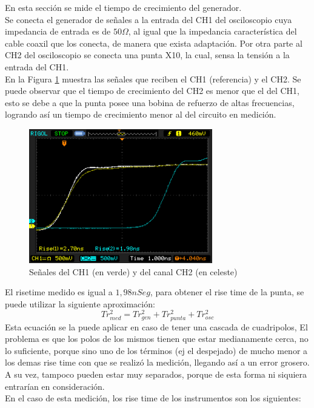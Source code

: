 \documentclass[a4paper,10pt]{article}
\begin{document}
		\indent En esta secci\'on se mide el tiempo de crecimiento del 
		generador. \\
 		\indent Se conecta el generador de se\~nales a la entrada del CH1 del
		osciloscopio cuya impedancia de entrada es de $50 \Omega$, al igual 
		que la impedancia caracter\'istica del cable coaxil que los conecta, 
		de manera que exista adaptaci\'on. Por otra parte al CH2 del 
		osciloscopio se conecta una punta X10, la cual, sensa la tensi\'on a 
		la entrada del CH1. \\
		\indent En la Figura \ref{img008} muestra las se\~nales que
		reciben el CH1 (referencia) y el CH2. Se puede observar que el tiempo
		de crecimiento del CH2 es menor que el del CH1, esto se debe a que la
		punta posee una bobina de refuerzo de altas frecuencias, logrando así
		un tiempo de crecimiento menor al del circuito en medición.
		
		\begin{figure}[!htb]
			\centering
			\includegraphics[width=8cm]
			{Imagenes/Mediciones instrumentos/NewFile10.png}
			\caption{Se\~nales del CH1 (en verde) y del canal CH2 (en celeste)
			} \label{img008}
		\end{figure}
		\indent El risetime medido es igual a $1,98 nSeg$, para obtener el 
		rise time de la punta, se puede utilizar la siguiente aproximación:
		$$Tr_{med}^2 = Tr_{gen}^2 + Tr_{punta}^2 + Tr_{osc}^2$$
		\indent Esta ecuación se la puede aplicar en caso de tener una cascada
		de cuadripolos, El problema es que los polos de los mismos tienen que 
		estar medianamente cerca, no lo suficiente, porque sino uno de los 
		términos (ej el despejado) de mucho menor a los demas rise time con 
		que se realizó la medición, llegando así a un error grosero. A su vez,
		tampoco pueden estar muy separados, porque de esta forma ni siquiera 
		entrarían en consideración. \\
		\indent En el caso de esta medición, los rise time de los instrumentos
		son los siguientes:
\end{document}
